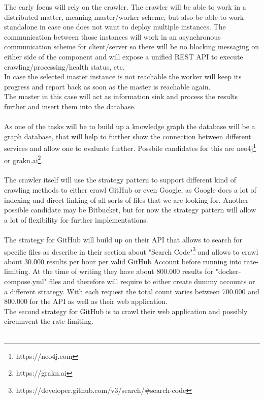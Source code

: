 The early focus will rely on the crawler. The crawler will be able to work in a distributed matter, meaning master/worker scheme, but also be able to work standalone in case one does not want to deploy multiple instances. The communication between those instances will work in an asynchronous communication scheme for client/server so there will be no blocking messaging on either side of the component and will expose a unified REST API to execute crawling/processing/health status, etc.\\
In case the selected master instance is not reachable the worker will keep its progress and report back as soon as the master is reachable again.\\
The master in this case will act as information sink and process the results further and insert them into the database.\\
\\
As one of the tasks will be to build up a knowledge graph the database will be a graph database, that will help to further show the connection between different services and allow one to evaluate further. Possbile candidates for this are neo4j\footnote{https://neo4j.com} or grakn.ai\footnote{https://grakn.ai}.\\
\\
The crawler itself will use the strategy pattern to support different kind of crawling methods to either crawl GitHub or even Google, as Google does a lot of indexing and direct linking of all sorts of files that we are looking for. Another possible candidate may be Bitbucket, but for now the strategy pattern will allow a lot of flexibility for further implementations.\\
\\
The strategy for GitHub will build up on their API that allows to search for specific files as describe in their section about "Search Code"\footnote{https://developer.github.com/v3/search/\#search-code} and allows to crawl about 30.000 results per hour per valid GitHub Account before running into rate-limiting. At the time of writing they have about 800.000 results for "docker-compose.yml" files and therefore will require to either create dummy accounts or a different strategy. With each request the total count varies between 700.000 and 800.000 for the API as well as their web application.\\
The second strategy for GitHub is to crawl their web application and possibly circumvent the rate-limiting.\\
\\
